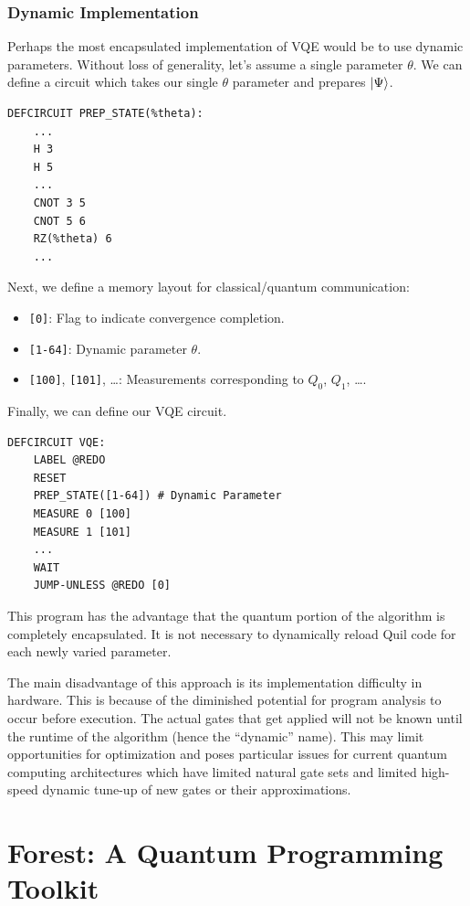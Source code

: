 \documentclass[conference]{IEEEtran}
\begin{document}
\subsubsection{Dynamic Implementation}\label{sec:VQE-dynamic}
Perhaps the most encapsulated implementation of VQE would be to use dynamic parameters. Without loss of generality, let's assume a single parameter $\theta$. We can define a circuit which takes our single $\theta$ parameter and prepares $\ket{\Psi}$.
\begin{verbatim}
DEFCIRCUIT PREP_STATE(%theta):
    ...
    H 3
    H 5
    ...
    CNOT 3 5
    CNOT 5 6
    RZ(%theta) 6
    ...
\end{verbatim}
Next, we define a memory layout for classical/quantum communication:
\begin{itemize}
\item \verb|[0]|: Flag to indicate convergence completion.
\item \verb|[1-64]|: Dynamic parameter $\theta$.
\item \verb|[100]|, \verb|[101]|, \dots: Measurements corresponding to $Q_0$, $Q_1$, \dots.
\end{itemize}
Finally, we can define our VQE circuit.
\begin{verbatim}
DEFCIRCUIT VQE:
    LABEL @REDO
    RESET
    PREP_STATE([1-64]) # Dynamic Parameter
    MEASURE 0 [100]
    MEASURE 1 [101]
    ...
    WAIT
    JUMP-UNLESS @REDO [0]
\end{verbatim}

This program has the advantage that the quantum portion of the algorithm is completely encapsulated. It is not necessary to dynamically reload Quil code for each newly varied parameter.

The main disadvantage of this approach is its implementation difficulty in hardware. This is because of the diminished potential for program analysis to occur before execution. The actual gates that get applied will not be known until the runtime of the algorithm (hence the ``dynamic'' name). This may limit opportunities for optimization and poses particular issues for current quantum computing architectures which have limited natural gate sets and limited high-speed dynamic tune-up of new gates or their approximations.

\section{Forest: A Quantum Programming Toolkit}\label{sec:toolkit}
\end{document}
